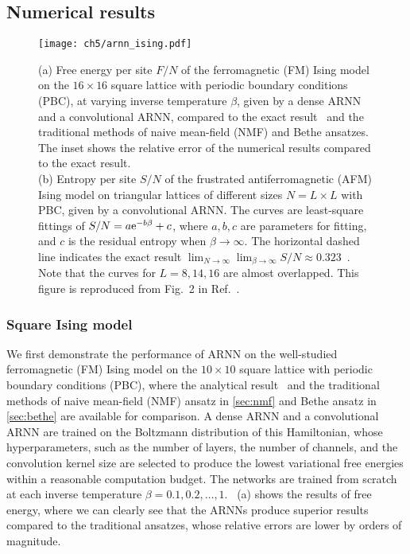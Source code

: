 \subsection{Numerical results}

\begin{figure}[htb]
\centering
\texttt{[image: ch5/arnn\_ising.pdf]}
\caption[ARNN results of Ising model on square and triangular lattices]{
(a) Free energy per site $F / N$ of the ferromagnetic (FM) Ising model on the $16 \times 16$ square lattice with periodic boundary conditions (PBC), at varying inverse temperature $\beta$, given by a dense ARNN and a convolutional ARNN, compared to the exact result~\cite{onsager1944crystal} and the traditional methods of naive mean-field (NMF) and Bethe ansatzes.
The inset shows the relative error of the numerical results compared to the exact result. \\
(b) Entropy per site $S / N$ of the frustrated antiferromagnetic (AFM) Ising model on triangular lattices of different sizes $N = L \times L$ with PBC, given by a convolutional ARNN.
The curves are least-square fittings of $S / N = a \mathrm{e}^{-b \beta} + c$, where $a, b, c$ are parameters for fitting, and $c$ is the residual  entropy when $\beta \to \infty$.
The horizontal dashed line indicates the exact result $\lim_{N \to \infty} \lim_{\beta \to \infty} S / N \approx 0.323$~\cite{wannier1950antiferromagnetism, wannier1973antiferromagnetism, houtappel1950order}.
Note that the curves for $L = 8, 14, 16$ are almost overlapped.
This figure is reproduced from Fig.~2 in Ref.~\cite{wu2019solving}.
}
\label{fig:arnn-ising}
\end{figure}

\subsubsection{Square Ising model}

We first demonstrate the performance of ARNN on the well-studied ferromagnetic (FM) Ising model on the $10 \times 10$ square lattice with periodic boundary conditions (PBC), where the analytical result~\cite{onsager1944crystal} and the traditional methods of naive mean-field (NMF) ansatz in \cref{sec:nmf} and Bethe ansatz in \cref{sec:bethe} are available for comparison. A dense ARNN and a convolutional ARNN are trained on the Boltzmann distribution of this Hamiltonian, whose hyperparameters, such as the number of layers, the number of channels, and the convolution kernel size are selected to produce the lowest variational free energies within a reasonable computation budget. The networks are trained from scratch at each inverse temperature $\beta = 0.1, 0.2, \ldots, 1$. ~(a) shows the results of free energy, where we can clearly see that the ARNNs produce superior results compared to the traditional ansatzes, whose relative errors are lower by orders of magnitude.

